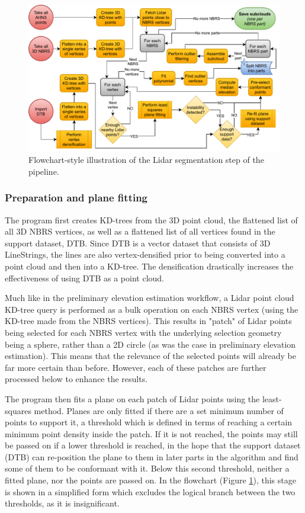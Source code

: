\begin{figure}
    \centering
    \includegraphics[width=0.9\linewidth]{final_report/figs/lidar_segmentation.pdf}
    \caption{Flowchart-style illustration of the Lidar segmentation step of the pipeline.}
    \label{fig:lidarsegmentationflow}
\end{figure}

\subsubsection{Preparation and plane fitting}

The program first creates KD-trees from the 3D point cloud, the flattened list of all 3D NBRS vertices, as well as a flattened list of all vertices found in the support dataset, DTB. Since DTB is a vector dataset that consists of 3D LineStrings, the lines are also vertex-densified prior to being converted into a point cloud and then into a KD-tree. The densification drastically increases the effectiveness of using DTB as a point cloud.

Much like in the preliminary elevation estimation workflow, a Lidar point cloud KD-tree query is performed as a bulk operation on each NBRS vertex (using the KD-tree made from the NBRS vertices). This results in "patch" of Lidar points being selected for each NBRS vertex with the underlying selection geometry being a sphere, rather than a 2D circle (as was the case in preliminary elevation estimation). This means that the relevance of the selected points will already be far more certain than before. However, each of these patches are further processed below to enhance the results.

The program then fits a plane on each patch of Lidar points using the least-squares method. Planes are only fitted if there are a set minimum number of points to support it, a threshold which is defined in terms of reaching a certain minimum point density inside the patch. If it is not reached, the points may still be passed on if a lower threshold is reached, in the hope that the support dataset (DTB) can re-position the plane to them in later parts in the algorithm and find some of them to be conformant with it. Below this second threshold, neither a fitted plane, nor the points are passed on. In the flowchart (Figure \ref{fig:lidarsegmentationflow}), this stage is shown in a simplified form which excludes the logical branch between the two thresholds, as it is insignificant.

